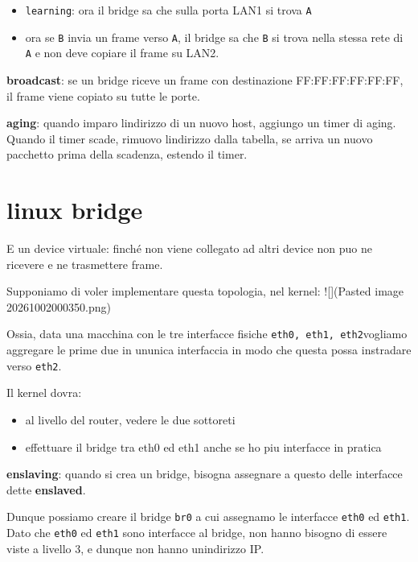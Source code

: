 \begin{itemize}
\tightlist
\item
  \passthrough{\lstinline!learning!}: ora il bridge sa che sulla porta
  LAN1 si trova \passthrough{\lstinline!A!}
\item
  ora se \passthrough{\lstinline!B!} invia un frame verso
  \passthrough{\lstinline!A!}, il bridge sa che
  \passthrough{\lstinline!B!} si trova nella stessa rete di
  \passthrough{\lstinline!A!} e non deve copiare il frame su LAN2.
\end{itemize}

\textbf{broadcast}: se un bridge riceve un frame con destinazione
FF:FF:FF:FF:FF:FF, il frame viene copiato su tutte le porte.

\textbf{aging}: quando imparo l\textquotesingle indirizzo di un nuovo
host, aggiungo un timer di aging. Quando il timer scade, rimuovo
l\textquotesingle indirizzo dalla tabella, se arriva un nuovo pacchetto
prima della scadenza, estendo il timer.

\section{linux bridge}\label{linux-bridge}

E\textquotesingle{} un device virtuale: finché non viene collegato ad
altri device non puo\textquotesingle{} ne ricevere e ne trasmettere
frame.

Supponiamo di voler implementare questa topologia, nel kernel:
!{[}{]}(Pasted image 20261002000350.png)

Ossia, data una macchina con le tre interfacce fisiche
\passthrough{\lstinline!eth0, eth1, eth2!}vogliamo aggregare le prime
due in un\textquotesingle unica interfaccia in modo che questa possa
instradare verso \passthrough{\lstinline!eth2!}.

Il kernel dovra:

\begin{itemize}
\tightlist
\item
  al livello del router, vedere le due sottoreti
\item
  effettuare il bridge tra eth0 ed eth1 anche se ho piu interfacce in
  pratica
\end{itemize}

\textbf{enslaving}: quando si crea un bridge, bisogna assegnare a questo
delle interfacce dette \textbf{enslaved}.

Dunque possiamo creare il bridge \passthrough{\lstinline!br0!} a cui
assegnamo le interfacce \passthrough{\lstinline!eth0!} ed
\passthrough{\lstinline!eth1!}. Dato che \passthrough{\lstinline!eth0!}
ed \passthrough{\lstinline!eth1!} sono interfacce al bridge, non hanno
bisogno di essere viste a livello 3, e dunque non hanno
un\textquotesingle indirizzo IP.

